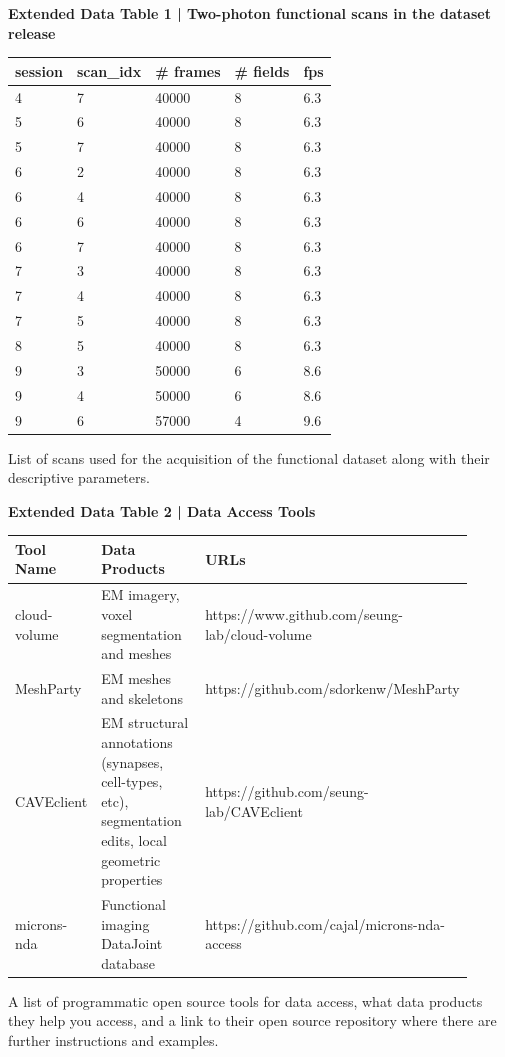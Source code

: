 \documentclass{article}
\begin{document}
\noindent\textbf{Extended Data Table 1 | Two-photon functional scans in the dataset release}

\begin{center}
\begin{tabular}{lllll}
\toprule
session & scan\_idx & \# frames & \# fields & fps \\
\midrule
4 & 7 & 40000 & 8 & 6.3 \\
5 & 6 & 40000 & 8 & 6.3 \\
5 & 7 & 40000 & 8 & 6.3 \\
6 & 2 & 40000 & 8 & 6.3 \\
6 & 4 & 40000 & 8 & 6.3 \\
6 & 6 & 40000 & 8 & 6.3 \\
6 & 7 & 40000 & 8 & 6.3 \\
7 & 3 & 40000 & 8 & 6.3 \\
7 & 4 & 40000 & 8 & 6.3 \\
7 & 5 & 40000 & 8 & 6.3 \\
8 & 5 & 40000 & 8 & 6.3 \\
9 & 3 & 50000 & 6 & 8.6 \\
9 & 4 & 50000 & 6 & 8.6 \\
9 & 6 & 57000 & 4 & 9.6 \\
\bottomrule
\end{tabular}
\end{center}
\noindent List of scans used for the acquisition of the functional dataset along with their descriptive parameters.

\noindent\textbf{Extended Data Table 2 | Data Access Tools}

\begin{center}
\small
\begin{tabular}{p{0.16\linewidth}p{0.3\linewidth}p{0.45\linewidth}}
\toprule
Tool Name & Data Products & URLs \\
\midrule
cloud-volume & EM imagery, voxel segmentation and meshes & https://www.github.com/seung-lab/cloud-volume \\
MeshParty & EM meshes and skeletons & https://github.com/sdorkenw/MeshParty \\
CAVEclient & EM structural annotations (synapses, cell-types, etc), segmentation edits, local geometric properties & https://github.com/seung-lab/CAVEclient \\
microns-nda & Functional imaging DataJoint database & https://github.com/cajal/microns-nda-access \\
\bottomrule
\end{tabular}
\end{center}
\noindent A list of programmatic open source tools for data access, what data products they help you access, and a link to their open source repository where there are further instructions and examples.
\end{document}
